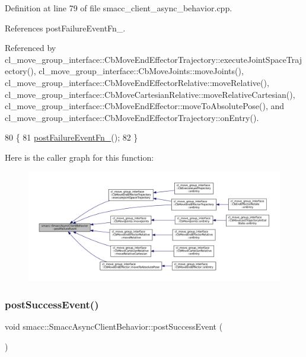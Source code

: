 Definition at line 79 of file smacc\+\_\+client\+\_\+async\+\_\+behavior.\+cpp.



References post\+Failure\+Event\+Fn\+\_\+.



Referenced by cl\+\_\+move\+\_\+group\+\_\+interface\+::\+Cb\+Move\+End\+Effector\+Trajectory\+::execute\+Joint\+Space\+Trajectory(), cl\+\_\+move\+\_\+group\+\_\+interface\+::\+Cb\+Move\+Joints\+::move\+Joints(), cl\+\_\+move\+\_\+group\+\_\+interface\+::\+Cb\+Move\+End\+Effector\+Relative\+::move\+Relative(), cl\+\_\+move\+\_\+group\+\_\+interface\+::\+Cb\+Move\+Cartesian\+Relative\+::move\+Relative\+Cartesian(), cl\+\_\+move\+\_\+group\+\_\+interface\+::\+Cb\+Move\+End\+Effector\+::move\+To\+Absolute\+Pose(), and cl\+\_\+move\+\_\+group\+\_\+interface\+::\+Cb\+Move\+End\+Effector\+Trajectory\+::on\+Entry().


\begin{DoxyCode}
80     \{
81         \hyperlink{classsmacc_1_1SmaccAsyncClientBehavior_a8041c43a0381f18fae6470a98eb9273d}{postFailureEventFn\_}();
82     \}
\end{DoxyCode}
Here is the caller graph for this function\+:
\nopagebreak
\begin{figure}[H]
\begin{center}
\leavevmode
\includegraphics[width=350pt]{classsmacc_1_1SmaccAsyncClientBehavior_af6fa358cb1ab5ed16791a201f59260e0_icgraph}
\end{center}
\end{figure}
\mbox{\label{classsmacc_1_1SmaccAsyncClientBehavior_adf18efe1f0e4eacc1277b8865a8a94b1}} 
\subsubsection{\texorpdfstring{post\+Success\+Event()}{postSuccessEvent()}}
{\footnotesize\ttfamily void smacc\+::\+Smacc\+Async\+Client\+Behavior\+::post\+Success\+Event (\begin{DoxyParamCaption}{ }\end{DoxyParamCaption})\hspace{0.3cm}{\ttfamily [protected]}}



